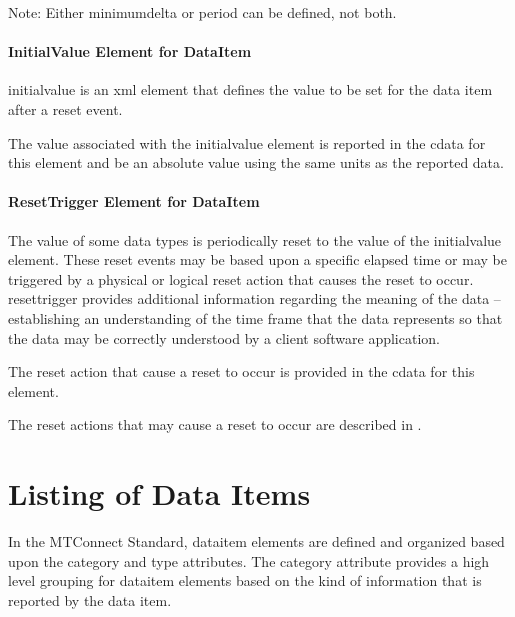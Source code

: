 

\begin{note}
\notesign Note: Either \gls{minimumdelta} or \gls{period} can be defined, not both.

\end{note}

\paragraph{InitialValue Element for DataItem}\mbox{}

\gls{initialvalue} is an \gls{xml} element that defines the value to be set for the data item after a reset event.

The value associated with the \gls{initialvalue} element is reported in the \gls{cdata} for this element and \must be an absolute value using the same units as the reported data.

\paragraph{ResetTrigger Element for DataItem}\mbox{}

The value of some data types is periodically reset to the value of the \gls{initialvalue} element.   These reset events may be based upon a specific elapsed time or may be triggered by a physical or logical reset action that causes the reset to occur.   \gls{resettrigger} provides additional information regarding the meaning of the data – establishing an understanding of the time frame that the data represents so that the data may be correctly understood by a client software application.



The reset action that \may cause a reset to occur is provided in the \gls{cdata} for this element. 

The reset actions that may cause a reset to occur are described in .



\section{Listing of Data Items}
\label{sec:Listing of Data Items}

In the MTConnect Standard, \gls{dataitem} elements are defined and organized based upon the \gls{category} and \gls{type} attributes.  
The \gls{category} attribute provides a high level grouping for \gls{dataitem} elements based on the kind of information that is reported by the data item.

